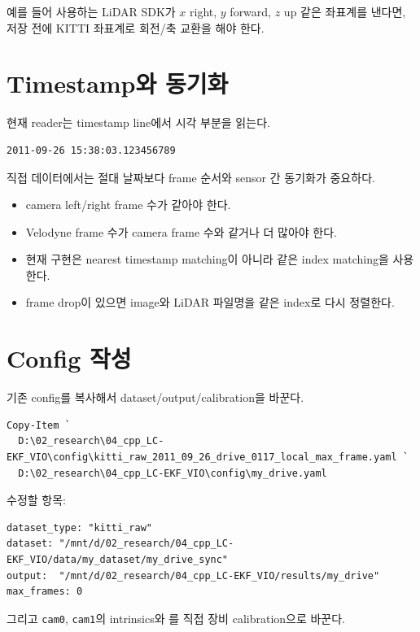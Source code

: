 \documentclass[11pt,a4paper,oneside]{report}
\begin{document}
예를 들어 사용하는 LiDAR SDK가 $x$ right, $y$ forward, $z$ up 같은 좌표계를 낸다면,  저장 전에 KITTI 좌표계로 회전/축 교환을 해야 한다.

\section{Timestamp와 동기화}

현재 reader는 timestamp line에서 시각 부분을 읽는다.

\begin{lstlisting}
2011-09-26 15:38:03.123456789
\end{lstlisting}

직접 데이터에서는 절대 날짜보다 frame 순서와 sensor 간 동기화가 중요하다.

\begin{itemize}[leftmargin=2em]
\item camera left/right frame 수가 같아야 한다.
\item Velodyne  frame 수가 camera frame 수와 같거나 더 많아야 한다.
\item 현재 구현은 nearest timestamp matching이 아니라 같은 index matching을 사용한다.
\item frame drop이 있으면 image와 LiDAR 파일명을 같은 index로 다시 정렬한다.
\end{itemize}

\section{Config 작성}

기존 config를 복사해서 dataset/output/calibration을 바꾼다.

\begin{lstlisting}
Copy-Item `
  D:\02_research\04_cpp_LC-EKF_VIO\config\kitti_raw_2011_09_26_drive_0117_local_max_frame.yaml `
  D:\02_research\04_cpp_LC-EKF_VIO\config\my_drive.yaml
\end{lstlisting}

수정할 항목:

\begin{lstlisting}
dataset_type: "kitti_raw"
dataset: "/mnt/d/02_research/04_cpp_LC-EKF_VIO/data/my_dataset/my_drive_sync"
output:  "/mnt/d/02_research/04_cpp_LC-EKF_VIO/results/my_drive"
max_frames: 0
\end{lstlisting}

그리고 \texttt{cam0}, \texttt{cam1}의 intrinsics와 를 직접 장비 calibration으로 바꾼다.
\end{document}
